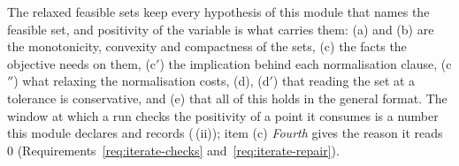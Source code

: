 
The relaxed feasible sets keep every hypothesis of this module that names
the feasible set, and positivity of the variable is what carries them:
(a) and (b) are the monotonicity, convexity and compactness of the
sets, (c) the facts the objective needs on them, (c$'$) the implication
behind each normalisation clause, (c$''$) what relaxing the normalisation
costs, (d), (d$'$) that reading the set at a tolerance is conservative,
and (e) that all of this holds in the general format.
The window at which a run checks the positivity of a point it consumes is
a number this module declares and records
(\,(ii)); item (c) \emph{Fourth}
gives the reason it reads $0$ (Requirements~\ref{req:iterate-checks}
and~\ref{req:iterate-repair}).

